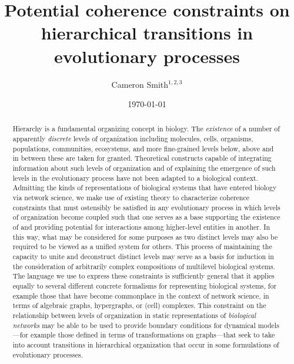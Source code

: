 \documentclass[aps,twocolumn]{revtex4-1}
\begin{document}
\title{\bf Potential coherence constraints on hierarchical transitions in evolutionary processes}

\author{Cameron Smith$^{1,2,3}$}


\date{\today}
\begin{abstract}
Hierarchy is a fundamental organizing concept in biology. The {\it existence} of a number of apparently {\it discrete} levels of organization including molecules, cells, organisms, populations, communities, ecosystems, and more fine-grained levels below, above and in between these are taken for granted. Theoretical constructs capable of integrating information about such levels of organization and of explaining the emergence of such levels in the evolutionary process have not been adapted to a biological context. Admitting the kinds of representations of biological systems that have entered biology via network science, we make use of existing theory to characterize coherence constraints that must ostensibly be satisfied in any evolutionary process in which levels of organization become coupled such that one serves as a base supporting the existence of and providing potential for interactions among higher-level entities in another. In this way, what may be considered for some purposes as two distinct levels may also be required to be viewed as a unified system for others. This process of maintaining the capacity to unite and deconstruct distinct levels may serve as a basis for induction in the consideration of arbitrarily complex compositions of multilevel biological systems. The language we use to express these constraints is sufficiently general that it applies equally to several different concrete formalisms for representing biological systems, for example those that have become commonplace in the context of network science, in terms of algebraic graphs, hypergraphs, or (cell) complexes. This constraint on the relationship between levels of organization in static representations of {\it biological networks} may be able to be used to provide boundary conditions for dynamical models---for example those defined in terms of transformations on graphs---that seek to take into account transitions in hierarchical organization that occur in some formulations of evolutionary processes.
\end{abstract}
\end{document}
